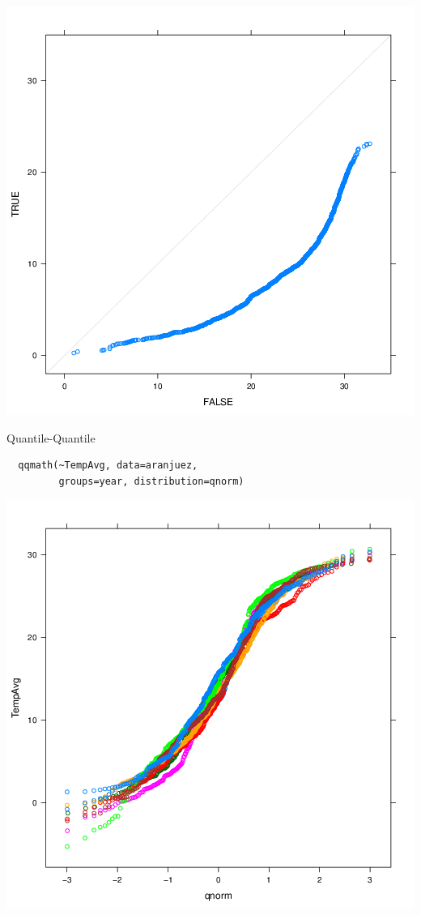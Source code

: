 \documentclass[xcolor={usenames,svgnames,dvipsnames}]{beamer}
\begin{document}
\begin{frame}[label=sec-3-53]{}
\includegraphics[width=.9\linewidth]{figs/qqWinter.png}
\end{frame}

\begin{frame}[fragile,label=sec-3-54]{Quantile-Quantile}
 \lstset{language=R,label= ,caption= ,numbers=none}
\begin{lstlisting}
  qqmath(~TempAvg, data=aranjuez,
         groups=year, distribution=qnorm)
\end{lstlisting}
\end{frame}

\begin{frame}[label=sec-3-55]{}
\includegraphics[width=.9\linewidth]{figs/qqNorm.png}
\end{frame}
\end{document}

